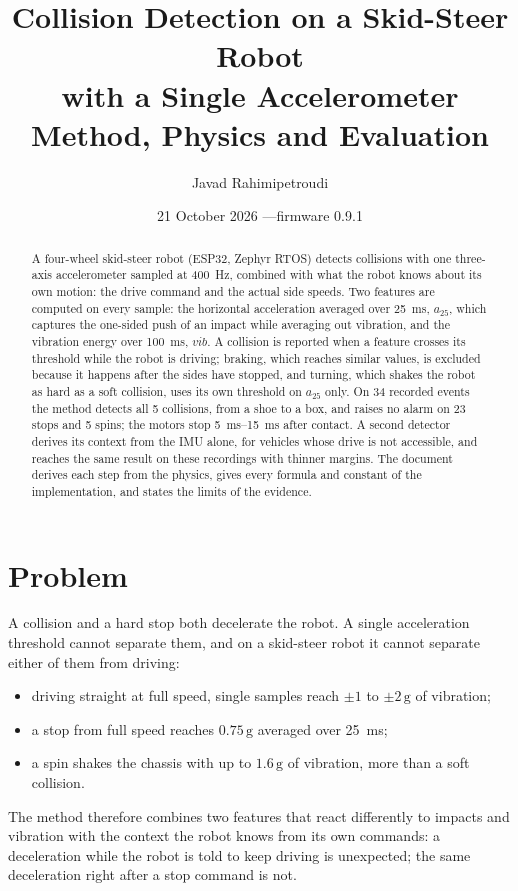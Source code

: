 \documentclass[11pt,a4paper]{article}
\title{\textbf{Collision Detection on a Skid-Steer Robot\\with a Single Accelerometer}\\[0.4em]
       \large Method, Physics and Evaluation}
\author{Javad Rahimipetroudi}
\date{21 October 2026 \quad---\quad firmware 0.9.1}
\newcommand{\g}{\,\mathrm{g}}
\newcommand{\azf}{a_{25}}
\newcommand{\vib}{\mathit{vib}}
\begin{document}
\maketitle

\begin{abstract}
A four-wheel skid-steer robot (ESP32, Zephyr RTOS) detects collisions with one three-axis
accelerometer sampled at \SI{400}{\hertz}, combined with what the robot knows about its own
motion: the drive command and the actual side speeds. Two features are computed on every
sample: the horizontal acceleration averaged over \SI{25}{\milli\second}, $\azf$, which
captures the one-sided push of an impact while averaging out vibration, and the vibration
energy over \SI{100}{\milli\second}, $\vib$. A collision is reported when a feature crosses its
threshold while the robot is driving; braking, which reaches similar values, is excluded
because it happens after the sides have stopped, and turning, which shakes the robot as hard
as a soft collision, uses its own threshold on $\azf$ only. On 34 recorded events the method
detects all 5 collisions, from a shoe to a box, and raises no alarm on 23 stops and 5 spins;
the motors stop \SIrange{5}{15}{\milli\second} after contact. A second detector derives its
context from the IMU alone, for vehicles whose drive is not accessible, and reaches the same
result on these recordings with thinner margins. The document derives each step
from the physics, gives every formula and constant of the implementation, and states the
limits of the evidence.
\end{abstract}

\tableofcontents

\section{Problem}

A collision and a hard stop both decelerate the robot. A single acceleration threshold cannot
separate them, and on a skid-steer robot it cannot separate either of them from driving:
\begin{itemize}
  \item driving straight at full speed, single samples reach $\pm1$ to $\pm2\g$ of vibration;
  \item a stop from full speed reaches $0.75\g$ averaged over \SI{25}{\milli\second};
  \item a spin shakes the chassis with up to $1.6\g$ of vibration, more than a soft collision.
\end{itemize}
The method therefore combines two features that react differently to impacts and vibration
with the context the robot knows from its own commands: a deceleration while the robot is told
to keep driving is unexpected; the same deceleration right after a stop command is not.
\end{document}
